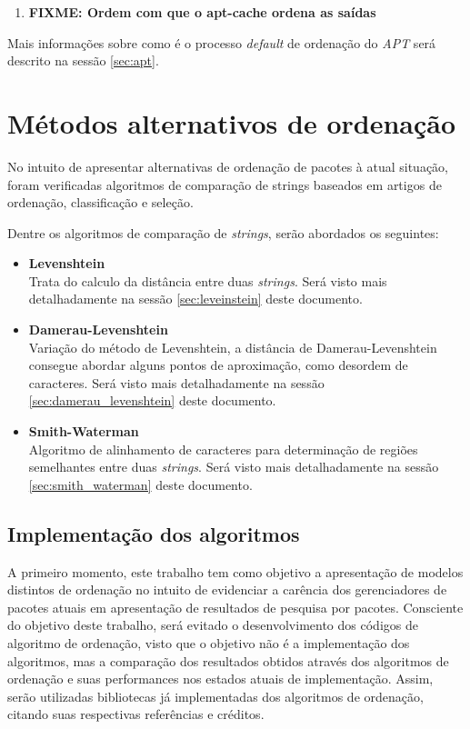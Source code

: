 \begin{enumerate}
	\item  \textbf{FIXME: Ordem com que o apt-cache ordena as saídas}
\end{enumerate}

Mais informações sobre como é o processo \textit{default} de ordenação do \textit{APT} será descrito na sessão \ref{sec:apt}.


\section{Métodos alternativos de ordenação} %
\label{sec:m_todos_alternativos_de_ordena_o}

No intuito de apresentar alternativas de ordenação de pacotes à atual situação, foram verificadas algoritmos de comparação de strings baseados em artigos de ordenação, classificação e seleção.

Dentre os algoritmos de comparação de \textit{strings}, serão abordados os seguintes:

\begin{itemize}
	\item \textbf{Levenshtein}\\
	Trata do calculo da distância entre duas \textit{strings}. Será visto mais detalhadamente na sessão \ref{sec:leveinstein} deste documento.
%
	\item \textbf{Damerau-Levenshtein}\\
	Variação do método de Levenshtein, a distância de Damerau-Levenshtein consegue abordar alguns pontos de aproximação, como desordem de caracteres. Será visto mais detalhadamente na sessão \ref{sec:damerau_levenshtein} deste documento.
%
	\item \textbf{Smith-Waterman}\\
	Algoritmo de alinhamento de caracteres para determinação de regiões semelhantes entre duas \textit{strings}. Será visto mais detalhadamente na sessão \ref{sec:smith_waterman} deste documento.

\end{itemize}

\subsection{Implementação dos algoritmos} %
\label{sub:implementa_o_dos_algoritmos}

A primeiro momento, este trabalho tem como objetivo a apresentação de modelos distintos de ordenação no intuito de evidenciar a carência dos gerenciadores de pacotes atuais em apresentação de resultados de pesquisa por pacotes. Consciente do objetivo deste trabalho, será evitado o desenvolvimento dos códigos de algoritmo de ordenação, visto que o objetivo não é a implementação dos algoritmos, mas a comparação dos resultados obtidos através dos algoritmos de ordenação e suas performances nos estados atuais de implementação. Assim, serão utilizadas bibliotecas já implementadas dos algoritmos de ordenação, citando suas respectivas referências e créditos.

